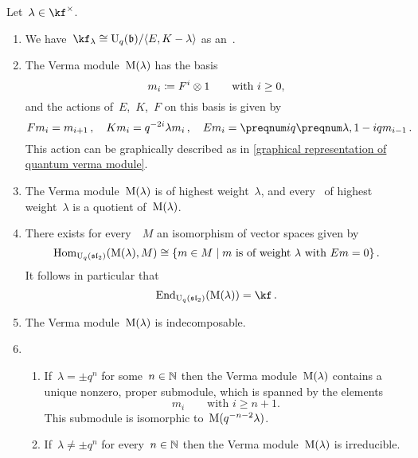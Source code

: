 \documentclass[a4paper, 11pt, oneside]{scrartcl}
\begin{document}
\begin{proposition}
  Let~$\lambda \in \kf^\times$.
  \begin{enumerate}
    \item
      We have~$\kf_\lambda \cong \Univ_q(\blie) / \gen{E, K - \lambda}$ as an~.
    \item
      The Verma module~$\operatorname{M}(\lambda)$ has the basis
      \[
        m_i
        \coloneqq
        F^i \otimes 1
        \qquad
        \text{with~$i \geq 0$,}
      \]
      and the actions of~$E$,~$K$,~$F$ on this basis is given by
      \[
        F m_i = m_{i+1} \,,
        \quad
        K m_i = q^{-2i} \lambda m_i \,,
        \quad
        E m_i = \qnum{i} \qnum{\lambda, 1-i} m_{i-1} \,.
      \]
      This action can be graphically described as in \cref{graphical representation of quantum verma module}.
    \item
      The Verma module~$\operatorname{M}(\lambda)$ is of highest weight~$\lambda$, and every~ of highest weight~$\lambda$ is a quotient of~$\operatorname{M}(\lambda)$.
    \item
      There exists for every~~$M$ an isomorphism of vector spaces given by
      \[
        \Hom_{\Univ_q(\sllie_2)}( \verma(\lambda), M )
        \cong
        \{
          m \in M
        \suchthat
          \text{$m$ is of weight~$\lambda$ with~$Em = 0$}
        \} \,.
      \]
      It follows in particular that
      \[
        \End_{\Univ_q(\sllie_2)}( \verma(\lambda) )
        =
        \kf \,.
      \]
    \item
      The Verma module~$\operatorname{M}(\lambda)$ is indecomposable.
    \item
      \begin{enumerate}
        \item
          If~$\lambda = \pm q^n$ for some~$n \in \mathbb{N}$ then the Verma module~$\operatorname{M}(\lambda)$ contains a unique nonzero, proper submodule, which is spanned by the elements
          \[
            m_i
            \qquad
            \text{with~$i \geq n+1$.}
          \]
          This submodule is isomorphic to~$\operatorname{M}(q^{-n-2} \lambda)$.
        \item
          If~$\lambda \neq \pm q^n$ for every~$n \in \mathbb{N}$ then the Verma module~$\operatorname{M}(\lambda)$ is irreducible.
      \end{enumerate}
  \end{enumerate}
\end{proposition}
\end{document}
